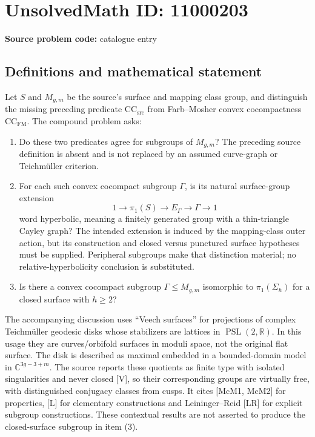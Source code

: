 \documentclass[11pt]{article}
\newcommand{\R}{\mathbb{R}}
\newcommand{\C}{\mathbb{C}}
\begin{document}
\section*{UnsolvedMath ID: 11000203}
\textbf{Source problem code:} catalogue entry
\subsection{Definitions and mathematical statement}
Let \(S\) and \(M_{g,m}\) be the source's surface and mapping class group, and distinguish the missing preceding predicate \(\mathrm{CC}_{\mathrm{src}}\) from Farb--Mosher convex cocompactness \(\mathrm{CC}_{\mathrm{FM}}\). The compound problem asks:
\begin{enumerate}
\item Do these two predicates agree for subgroups of \(M_{g,m}\)? The preceding source definition is absent and is not replaced by an assumed curve-graph or Teichm\"uller criterion.
\item For each such convex cocompact subgroup \(\Gamma\), is its natural surface-group extension
\[
 1\longrightarrow\pi_1(S)\longrightarrow E_\Gamma
 \longrightarrow\Gamma\longrightarrow1
\]
word hyperbolic, meaning a finitely generated group with a thin-triangle Cayley graph? The intended extension is induced by the mapping-class outer action, but its construction and closed versus punctured surface hypotheses must be supplied. Peripheral subgroups make that distinction material; no relative-hyperbolicity conclusion is substituted.
\item Is there a convex cocompact subgroup \(\Gamma\leq M_{g,m}\) isomorphic to \(\pi_1(\Sigma_h)\) for a closed surface with \(h\geq2\)?
\end{enumerate}

The accompanying discussion uses ``Veech surfaces'' for projections of complex Teichm\"uller geodesic disks whose stabilizers are lattices in \(\operatorname{PSL}(2,\R)\). In this usage they are curves/orbifold surfaces in moduli space, not the original flat surface. The disk is described as maximal embedded in a bounded-domain model in \(\C^{3g-3+m}\). The source reports these quotients as finite type with isolated singularities and never closed [V], so their corresponding groups are virtually free, with distinguished conjugacy classes from cusps. It cites [McM1, McM2] for properties, [L] for elementary constructions and Leininger--Reid [LR] for explicit subgroup constructions. These contextual results are not asserted to produce the closed-surface subgroup in item (3).
\end{document}
